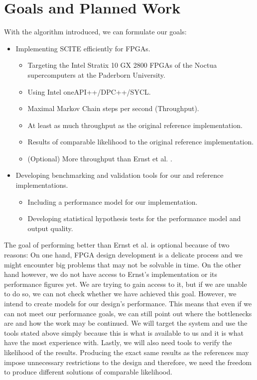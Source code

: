 \section{Goals and Planned Work}

With the algorithm introduced, we can formulate our goals:
\begin{itemize}
    \item Implementing \ac{SCITE} efficiently for \acp{FPGA}.
    \begin{itemize}
        \item Targeting the Intel Stratix 10 GX 2800 \acp{FPGA} of the Noctua supercomputers at the Paderborn University.
        \item Using Intel oneAPI++/DPC++/SYCL.
        \item Maximal Markov Chain steps per second (Throughput).
        \item At least as much throughput as the original reference implementation.
        \item Results of comparable likelihood to the original reference implementation.
        \item (Optional) More throughput than Ernst et al. \cite{ernst2020Performance}.
    \end{itemize}
    \item Developing benchmarking and validation tools for our and reference implementations.
    \begin{itemize}
        \item Including a performance model for our implementation.
        \item Developing statistical hypothesis tests for the performance model and output quality.
    \end{itemize}
\end{itemize}

The goal of performing better than Ernst et al. is optional because of two reasons: On one hand, \ac{FPGA} design development is a delicate process and we might encounter big problems that may not be solvable in time. On the other hand however, we do not have access to Ernst's implementation or its performance figures yet. We are trying to gain access to it, but if we are unable to do so, we can not check whether we have achieved this goal. However, we intend to create models for our design's performance. This means that even if we can not meet our performance goals, we can still point out where the bottlenecks are and how the work may be continued. We will target the system and use the tools stated above simply because this is what is available to us and it is what have the most experience with. Lastly, we will also need tools to verify the likelihood of the results. Producing the exact same results as the references may impose unnecessary restrictions to the design and therefore, we need the freedom to produce different solutions of comparable likelihood.

